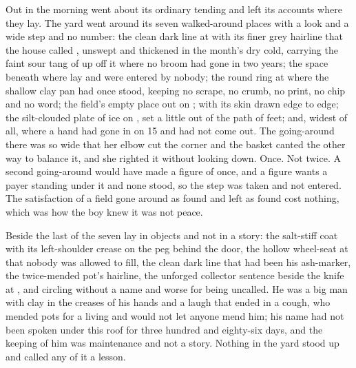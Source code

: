 \scenebreak

Out in  the morning went about its ordinary tending and left its accounts where they lay. The yard went around its seven walked-around places with a look and a wide step and no number: the clean dark line at  with its finer grey hairline that the house called , unswept and thickened in the month's dry cold, carrying the faint sour tang of  up off it where no broom had gone in two years; the space beneath  where  lay and were entered by nobody; the round ring at  where the shallow clay pan had once stood, keeping no scrape, no crumb, no print, no chip and no word; the field's empty place out on ;  with its skin drawn edge to edge; the silt-clouded plate of ice on , set a little out of the path of feet; and, widest of all,  where a hand had gone in on  15 and had not come out. The going-around there was so wide that her elbow cut the corner and the basket canted the other way to balance it, and she righted it without looking down. Once. Not twice. A second going-around would have made a figure of once, and a figure wants a payer standing under it and none stood, so the step was taken and not entered. The satisfaction of a field gone around as found and left as found cost nothing, which was how the boy knew it was not peace.

Beside the last of the seven lay  in objects and not in a story: the salt-stiff coat with its left-shoulder crease on the peg behind the door, the hollow wheel-seat at  that nobody was allowed to fill, the clean dark line that had been his ash-marker, the twice-mended pot's hairline, the unforged collector sentence beside the knife at , and  circling without a name and worse for being uncalled. He was a big man with clay in the creases of his hands and a laugh that ended in a cough, who mended pots for a living and would not let anyone mend him; his name had not been spoken under this roof for three hundred and eighty-six days, and the keeping of him was maintenance and not a story. Nothing in the yard stood up and called any of it a lesson.

